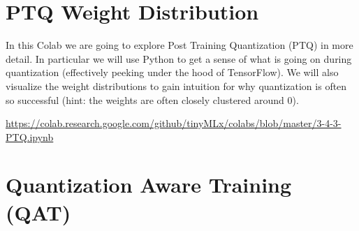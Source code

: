 \section{PTQ Weight Distribution}

In this Colab we are going to explore Post Training Quantization (PTQ) in more detail. In particular we will use Python to get a sense of what is going on during quantization (effectively peeking under the hood of TensorFlow). We will also visualize the weight distributions to gain intuition for why quantization is often so successful (hint: the weights are often closely clustered around 0).

\url{https://colab.research.google.com/github/tinyMLx/colabs/blob/master/3-4-3-PTQ.ipynb}

\section{Quantization Aware Training (QAT)}

